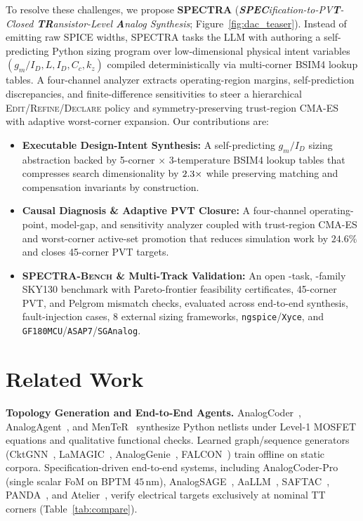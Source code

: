\documentclass[sigconf,review,anonymous]{acmart}
\begin{document}
To resolve these challenges, we propose \textbf{\textsc{SPECTRA}} (\emph{\textbf{SPEC}ifica\-tion-to-PV\textbf{T}-Closed \textbf{TR}ansistor-Level \textbf{A}nalog Synthesis}; Figure~\ref{fig:dac_teaser}). Instead of emitting raw SPICE widths, \textsc{SPECTRA} tasks the LLM with authoring a self-predicting Python sizing program over low-dimensional physical intent variables $(g_m/I_D, L, I_D, C_c, k_z)$ compiled deterministically via multi-corner BSIM4 lookup tables. A four-channel analyzer extracts operating-region margins, self-prediction discrepancies, and finite-difference sensitivities to steer a hierarchical \textsc{Edit}/\textsc{Refine}/\textsc{Declare} policy and symmetry-preserving trust-region CMA-ES with adaptive worst-corner expansion. Our contributions are:
\begin{itemize}[leftmargin=*, topsep=1.5pt, itemsep=1pt]
\item \textbf{Executable Design-Intent Synthesis:} A self-predicting $g_m/I_D$ sizing abstraction backed by 5-corner $\times$ 3-temperature BSIM4 lookup tables that compresses search dimensionality by $2.3{}\times$ while preserving matching and compensation invariants by construction.
\item \textbf{Causal Diagnosis \& Adaptive PVT Closure:} A four-channel operating-point, model-gap, and sensitivity analyzer coupled with trust-region CMA-ES and worst-corner active-set promotion that reduces simulation work by $24.6\%$ and closes 45-corner PVT targets.
\item \textbf{\textsc{SPECTRA-Bench} \& Multi-Track Validation:} An open \NTasksTotal{}-task, \NPrimaryFamilies{}-family SKY130 benchmark with Pareto-frontier feasibility certificates, 45-corner PVT, and Pelgrom mismatch checks, evaluated across end-to-end synthesis, \FaultN{} fault-injection cases, 8 external sizing frameworks, \texttt{ngspice}/\allowbreak\texttt{Xyce}, and \texttt{GF180MCU}/\allowbreak\texttt{ASAP7}/\allowbreak\texttt{SGAnalog}.
\end{itemize}

\section{Related Work}
\label{sec:related}


\textbf{Topology Generation and End-to-End Agents.} AnalogCoder~\cite{lai2025analogcoder}, AnalogAgent~\cite{bao2026analogagent}, and MenTeR~\cite{chen2025menter} synthesize Python netlists under Level-1 MOSFET equations and qualitative functional checks. Learned graph/sequence generators (CktGNN~\cite{dong2023cktgnn}, LaMAGIC~\cite{chang2024lamagic,chang2025lamagic2}, AnalogGenie~\cite{gao2025analoggenie}, FALCON~\cite{mehradfar2025falcon}) train offline on static corpora. Specification-driven end-to-end systems, including AnalogCoder-Pro~\cite{lai2026analogcoderpro} (single scalar FoM on BPTM $45\,\mathrm{nm}$), AnalogSAGE~\cite{wang2025analogsage}, AaLLM~\cite{habib2026aallm}, SAFTAC~\cite{huang2026saftac}, PANDA~\cite{zhang2026panda}, and Atelier~\cite{shen2026atelier}, verify electrical targets exclusively at nominal TT corners (Table~\ref{tab:compare}).
\end{document}

